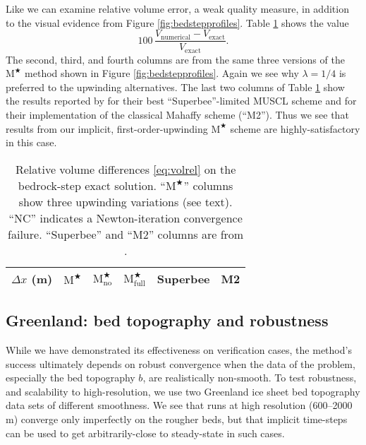 \documentclass[review,letterpaper]{igs}
\newcommand{\Mstar}{$\text{M}^{\bigstar}$\xspace}
\newcommand{\Mstarnoup}{$\text{M}^{\bigstar}_{\text{no}}$\xspace}
\newcommand{\Mstarfullup}{$\text{M}^{\bigstar}_{\text{full}}$\xspace}
\begin{document}
Like \cite{JaroschSchoofAnslow2013} we can examine relative volume error, a weak quality measure, in addition to the visual evidence from Figure \ref{fig:bedstepprofiles}.  Table \ref{tab:bedstepvol} shows the value
\begin{equation}
100\, \frac{V_{\text{numerical}} - V_{\text{exact}}}{V_{\text{exact}}}. \label{eq:volrel}
\end{equation}
The second, third, and fourth columns are from the same three versions of the \Mstar method shown in Figure \ref{fig:bedstepprofiles}.  Again we see why $\lambda=1/4$ is preferred to the upwinding alternatives.  The last two columns of Table \ref{tab:bedstepvol} show the results reported by \cite{JaroschSchoofAnslow2013} for their best ``Superbee''-limited MUSCL scheme and for their implementation of the classical Mahaffy scheme (``M2'').  Thus we see that results from our implicit, first-order-upwinding \Mstar scheme are highly-satisfactory in this case.

\begin{table}[ht]
  \caption{Relative volume differences \eqref{eq:volrel} on the bedrock-step exact solution.  ``\Mstar'' columns show three upwinding variations (see text).  ``NC'' indicates a Newton-iteration convergence failure.  ``Superbee'' and ``M2'' columns are from \cite{JaroschSchoofAnslow2013}.}
  \vskip4mm \centering
  \begin{tabular}{lccccc}
    $\Delta x$ (m) & \Mstar & \Mstarnoup & \Mstarfullup & Superbee & M2 \\  \hline

  \end{tabular}
  \label{tab:bedstepvol}
\end{table}


\subsection{Greenland: bed topography and robustness}

While we have demonstrated its effectiveness on verification cases, the method's success ultimately depends on robust convergence when the data of the problem, especially the bed topography $b$, are realistically non-smooth.  To test robustness, and scalability to high-resolution, we use two Greenland ice sheet bed topography data sets of different smoothness.  We see that runs at high resolution (600--2000 m) converge only imperfectly on the rougher beds, but that implicit time-steps can be used to get arbitrarily-close to steady-state in such cases.
\end{document}
